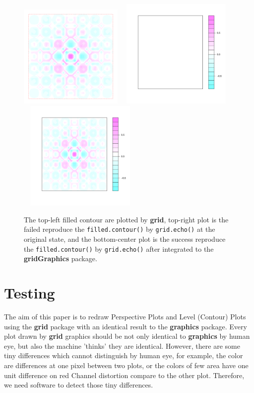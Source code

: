 \documentclass{report}
\begin{document}
\begin{figure}[h]
	\begin{center}
		\includegraphics[height = 5cm, width = 5cm]{figure/filledContour_origin_02.pdf}
		\includegraphics[height = 5.3cm, width = 6cm]{figure/filledContour_origin_03.pdf}
		\includegraphics[height = 5.3cm, width = 6cm]{figure/filledContour_origin_01.pdf}
		
		\caption{The top-left filled contour are plotted by \textbf{grid}, top-right plot is the failed reproduce the \texttt{filled.contour()} by \texttt{grid.echo()} at the original state, and the bottom-center plot is the success reproduce the \texttt{filled.contour()} by \texttt{grid.echo()} after integrated to the \textbf{gridGraphics} package.}
		\label{figure_4.6}
	\end{center}
\end{figure}


\chapter{Testing}
The aim of this paper is to redraw Perspective Plots and Level (Contour) Plots using the \textbf{grid} package with an identical result to the \textbf{graphics} package. Every plot drawn by \textbf{grid} graphics should be not only identical to \textbf{graphics} by human eye, but also the machine 'thinks' they are identical. However, there are some tiny differences which cannot distinguish by human eye, for example, the color are differences at one pixel between two plots, or the colors of few area have one unit difference on red Channel distortion compare to the other plot. Therefore, we need software to detect those tiny differences.\\
\end{document}
